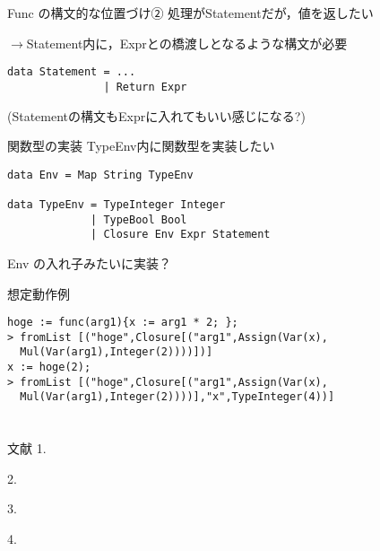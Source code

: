 \documentclass[uplatex,dvipdfmx,ja=standard]{beamer}
\begin{document}
\begin{frame}[fragile]{Func の構文的な位置づけ②}
    処理がStatementだが，値を返したい

    $\to$Statement内に，Exprとの橋渡しとなるような構文が必要

    \begin{verbatim}
data Statement = ...
               | Return Expr 
    \end{verbatim}
    (Statementの構文もExprに入れてもいい感じになる?)
\end{frame}

\begin{frame}[fragile]{関数型の実装}
    TypeEnv内に関数型を実装したい
    \begin{verbatim}
data Env = Map String TypeEnv

data TypeEnv = TypeInteger Integer
             | TypeBool Bool
             | Closure Env Expr Statement
    \end{verbatim}
    Env の入れ子みたいに実装？

\end{frame}

\begin{frame}[fragile]{想定動作例}
    \begin{verbatim}
hoge := func(arg1){x := arg1 * 2; };
> fromList [("hoge",Closure[("arg1",Assign(Var(x),
  Mul(Var(arg1),Integer(2))))])]
x := hoge(2);
> fromList [("hoge",Closure[("arg1",Assign(Var(x),
  Mul(Var(arg1),Integer(2))))],"x",TypeInteger(4))]
    \end{verbatim}
\end{frame}

\section{}
\begin{frame}{文献}
1. 

2. 

3.

4.
\end{frame}


%
\end{document}
